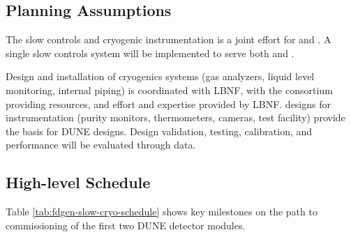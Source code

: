 \subsection{Planning Assumptions}
\label{sec:fdgen-slow-cryo-org-assmp}

The slow controls and cryogenic instrumentation is a joint effort for \single and \dual{}.
A single slow controls system will be implemented to serve both \single and \dual{}.

Design and installation of cryogenics systems (gas analyzers, liquid level monitoring, internal piping) is coordinated with LBNF, with the consortium providing resources, and effort and expertise provided by LBNF.
 designs for \lar instrumentation (purity monitors, thermometers, cameras, test facility) provide the basis for DUNE designs. Design validation, testing, calibration, and performance will be evaluated through  data.



\subsection{High-level Schedule}
\label{sec:fdgen-slow-cryo-org-cs}

Table \ref{tab:fdgen-slow-cryo-schedule} shows key milestones on
the path to  commissioning of the first two DUNE detector modules.

